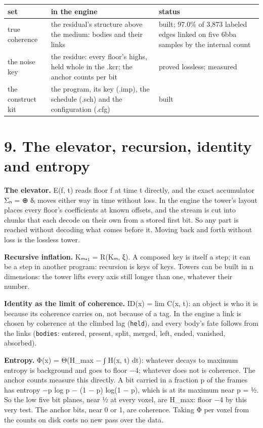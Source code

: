 {\small
\setlength{\tabcolsep}{6pt}
\begin{longtable}{>{\RaggedRight\arraybackslash}p{}>{\RaggedRight\arraybackslash}p{}>{\RaggedRight\arraybackslash}p{}}
\toprule
set & in the engine & status \\
\midrule
\endhead
true coherence & the residual's structure above the medium: bodies and their links & built; 97.0\% of 3,873 labeled edges linked on five 6bba samples by the internal count \\
the noise key & the residue: every floor's highs, held whole in the .kcr; the anchor counts per bit & proved lossless; measured \\
the construct kit & the program, its key (.imp), the schedule (.sch) and the configuration (.cfg) & built \\
\bottomrule
\end{longtable}
}

\section{\texorpdfstring{9. The elevator, recursion, identity and entropy}{9. The elevator, recursion, identity and entropy}}

\textbf{The elevator.} E(f, t) reads floor f at time t directly, and the exact accumulator Σₙ = ⊕ δᵢ moves either way in time without loss. In the engine the tower's layout places every floor's coefficients at known offsets, and the stream is cut into chunks that each decode on their own from a stored first bit. So any part is reached without decoding what comes before it. Moving back and forth without loss is the lossless tower.

\textbf{Recursive inflation.} Kₘ₊₁ = R(Kₘ, ξ). A composed key is itself a step; it can be a step in another program: recursion is keys of keys. Towers can be built in n dimensions: the tower lifts every axis still longer than one, whatever their number.

\textbf{Identity as the limit of coherence.} ID(x) = lim C(x, t): an object is who it is because its coherence carries on, not because of a tag. In the engine a link is chosen by coherence at the climbed lag (\texttt{held}), and every body's fate follows from the links (\texttt{bodies}: entered, present, split, merged, left, ended, vanished, absorbed).

\textbf{Entropy.} Φ(x) = Θ(H\_\allowbreak{}max − ∫ H(x, t) dt): whatever decays to maximum entropy is background and goes to floor −4; whatever does not is coherence. The anchor counts measure this directly. A bit carried in a fraction p of the frames has entropy −p log p − (1 − p) log(1 − p), which is at its maximum near p = ½. So the low five bit planes, near ½ at every voxel, are H\_\allowbreak{}max: floor −4 by this very test. The anchor bits, near 0 or 1, are coherence. Taking Φ per voxel from the counts on disk costs no new pass over the data.


